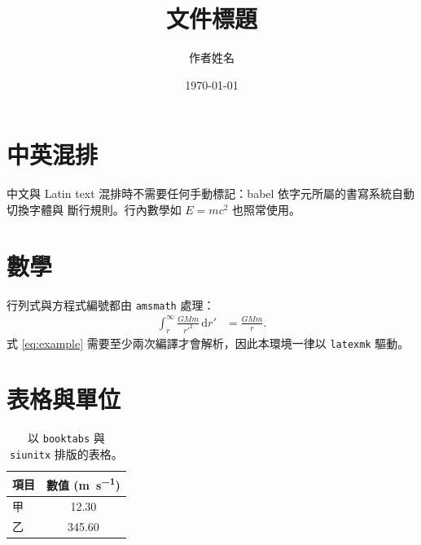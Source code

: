 \documentclass[11pt, a4paper]{article}
\title{\textbf{文件標題}}
\author{作者姓名}
\date{\today}
\begin{document}
\maketitle

\section{中英混排}
中文與 Latin text 混排時不需要任何手動標記：babel 依字元所屬的書寫系統自動切換字體與
斷行規則。行內數學如 $E = mc^{2}$ 也照常使用。

\section{數學}
行列式與方程式編號都由 \texttt{amsmath} 處理：
\begin{align}
  \int_{r}^{\infty} \frac{GMm}{r'^{2}} \, \mathrm{d}r' &= \frac{GMm}{r}. \label{eq:example}
\end{align}
式 \eqref{eq:example} 需要至少兩次編譯才會解析，因此本環境一律以 \texttt{latexmk} 驅動。

\section{表格與單位}
\begin{table}[htbp]
  \centering
  \begin{tabular}{lS[table-format=3.2]}
    \toprule
    項目 & {數值 (\si{\meter\per\second})} \\
    \midrule
    甲   & 12.30 \\
    乙   & 345.60 \\
    \bottomrule
  \end{tabular}
  \caption{以 \texttt{booktabs} 與 \texttt{siunitx} 排版的表格。}
\end{table}
\end{document}
